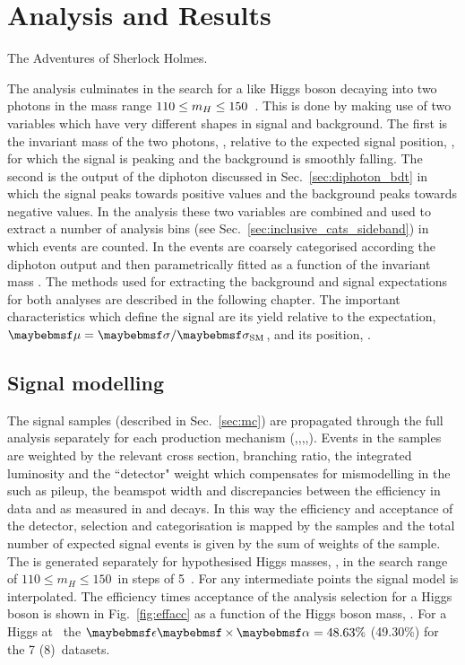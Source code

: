 \chapter{Analysis and Results}
\label{chap:results}
{The Adventures of Sherlock Holmes.}

The analysis culminates in the search for a \SM like Higgs boson decaying into two photons in the mass range $110\leq m_{H}\leq 150$~\GeV. This is done by making use of two variables which have very different shapes in signal and background. The first is the invariant mass of the two photons, \mgg, relative to the expected signal position, \mH, for which the signal is peaking and the background is smoothly falling. The second is the output of the diphoton \BDT discussed in Sec.~\ref{sec:diphoton_bdt} in which the signal peaks towards positive values and the background peaks towards negative values. In the \SMVA analysis these two variables are combined and used to extract a number of analysis bins (see Sec.~\ref{sec:inclusive_cats_sideband}) in which events are counted. In the \MFM events are coarsely categorised according the diphoton \BDT output and then parametrically fitted as a function of the invariant mass \mgg. The methods used for extracting the background and signal expectations for both analyses are described in the following chapter. The important characteristics which define the signal are its yield relative to the \SM expectation, $\mu=\musm$, and its position, \mH.

\section{Signal modelling}
\label{sec:signal_model}

The signal \MC samples (described in Sec.~\ref{sec:mc}) are propagated through the full analysis separately for each production mechanism (\ggH,\VBF,\WH,\ZH,\ttH). Events in the samples are weighted by the relevant \SM cross section, branching ratio, the integrated luminosity and the ``detector" weight which compensates for mismodelling in the \MC such as pileup, the beamspot width and discrepancies between the efficiency in data and \MC as measured in \Zee and \Zmumugamma decays. In this way the efficiency and acceptance of the detector, selection and categorisation is mapped by the \MC samples and the total number of expected \SM signal events is given by the sum of weights of the sample. The \MC is generated separately for hypothesised Higgs masses, \mH, in the search range of $110 \leq m_{H} \leq 150$~\GeV in steps of 5~\GeV. For any intermediate points the signal model is interpolated. The efficiency times acceptance of the analysis selection for a \SM Higgs boson is shown in Fig.~\ref{fig:effacc} as a function of the Higgs boson mass, \mH. For a Higgs at ~\GeV the $\ea=48.63\%$ (49.30\%) for the 7 (8)~\TeV datasets.

